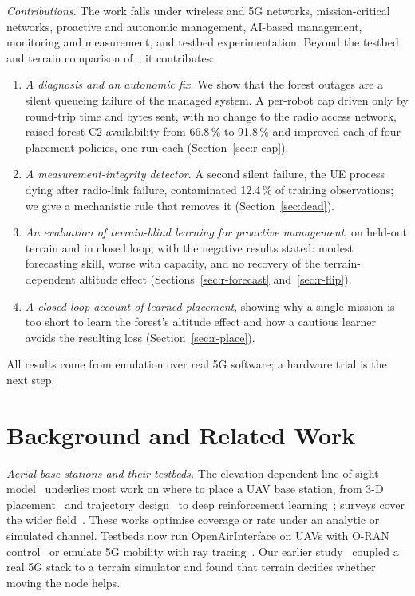 \textit{Contributions.} The work falls under wireless and 5G networks,
mission-critical networks, proactive and autonomic management, AI-based
management, monitoring and measurement, and testbed experimentation. Beyond
the testbed and terrain comparison of~\cite{makhubela2026satnac}, it
contributes:
\begin{enumerate}
\item \emph{A diagnosis and an autonomic fix.} We show that the forest
outages are a silent queueing failure of the managed system. A per-robot cap
driven only by round-trip time and bytes sent, with no change to the radio
access network, raised forest C2 availability from 66.8\,\% to 91.8\,\% and improved each of
four placement policies, one run each (Section~\ref{sec:r-cap}).
\item \emph{A measurement-integrity detector.} A second silent failure, the
UE process dying after radio-link failure, contaminated 12.4\,\% of training
observations; we give a mechanistic rule that removes it
(Section~\ref{sec:dead}).
\item \emph{An evaluation of terrain-blind learning for proactive management},
on held-out terrain and in closed loop, with the negative results stated:
modest forecasting skill, worse with capacity, and no recovery of the
terrain-dependent altitude effect (Sections~\ref{sec:r-forecast}
and~\ref{sec:r-flip}).
\item \emph{A closed-loop account of learned placement}, showing why a single
mission is too short to learn the forest's altitude effect and how a cautious
learner avoids the resulting loss (Section~\ref{sec:r-place}).
\end{enumerate}
All results come from emulation over real 5G software; a hardware trial is the
next step.
\section{Background and Related Work}
\label{sec:related}

\textit{Aerial base stations and their testbeds.} The elevation-dependent
line-of-sight model~\cite{alhourani2014modeling} underlies most work on where
to place a UAV base station, from 3-D placement~\cite{boryaliniz2016efficient,
kalantari2016number} and trajectory design~\cite{wu2018common} to deep
reinforcement learning~\cite{qiu2020placement}; surveys cover the wider
field~\cite{zeng2016wireless,mozaffari2019tutorial}. These works optimise
coverage or rate under an analytic or simulated channel. Testbeds now run
OpenAirInterface on UAVs with O-RAN control~\cite{moore2024aerpaw} or emulate
5G mobility with ray tracing~\cite{iye2025owdt}. Our earlier
study~\cite{makhubela2026satnac} coupled a real 5G stack to a terrain
simulator and found that terrain decides whether moving the node helps.

